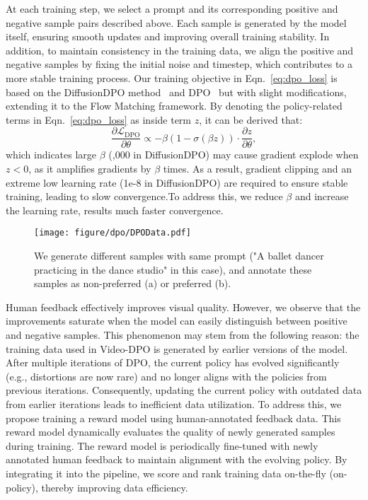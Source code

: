 At each training step, we select a prompt and its corresponding positive and negative sample pairs described above. Each sample is generated by the model itself, ensuring smooth updates and improving overall training stability. In addition, to maintain consistency in the training data, we align the positive and negative samples by fixing the initial noise and timestep, which contributes to a more stable training process. 
Our training objective in Eqn.~\ref{eq:dpo_loss} is based on the DiffusionDPO method~\cite{wallace2024diffusion} and DPO~\cite{rafailov2024direct} but with slight modifications, extending it to the Flow Matching framework. By denoting the policy-related terms in Eqn.~\ref{eq:dpo_loss} as inside term $z$, it can be derived that:
\begin{equation}\label{eq:dpo_beta}
\frac{\partial \mathcal{L}_{\text{DPO}}}{\partial \theta} \propto -\beta (1 - \sigma(\beta z)) \cdot \frac{\partial z}{\partial \theta},
\end{equation}
which indicates large $\beta$ (,000 in DiffusionDPO) may cause gradient explode when $z < 0$, as it amplifies gradients by $\beta$ times. As a result, gradient clipping and an extreme low learning rate (\eg 1e-8 in DiffusionDPO) are required to ensure stable training, leading to slow convergence.To address this, we reduce $\beta$ and increase the learning rate, results much faster convergence. 


\begin{figure*}[t]
    \centering
    \texttt{[image: figure/dpo/DPOData.pdf]}
    \caption{We generate different samples with same prompt ("A ballet dancer practicing in the dance studio" in this case), and annotate these samples as non-preferred (a) or preferred (b). }
    \label{fig:dpodata}
\end{figure*}


Human feedback effectively improves visual quality. However, we observe that the improvements saturate when the model can easily distinguish between positive and negative samples. This phenomenon may stem from the following reason: the training data used in Video-DPO is generated by earlier versions of the model. After multiple iterations of DPO, the current policy has evolved significantly (e.g., distortions are now rare) and no longer aligns with the policies from previous iterations. Consequently, updating the current policy with outdated data from earlier iterations leads to inefficient data utilization.
To address this, we propose training a reward model using human-annotated feedback data. This reward model dynamically evaluates the quality of newly generated samples during training. The reward model is periodically fine-tuned with newly annotated human feedback to maintain alignment with the evolving policy. By integrating it into the pipeline, we score and rank training data on-the-fly (on-policy), thereby improving data efficiency.









